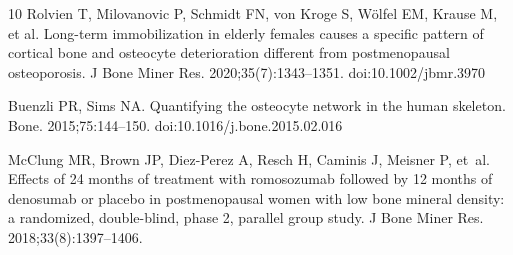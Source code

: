 \documentclass[10pt,letterpaper]{article}
\begin{document}
\begin{thebibliography}{10}
Rolvien T, Milovanovic P, Schmidt FN, von Kroge S, W\"olfel EM, Krause M, et al.
\newblock Long-term immobilization in elderly females causes a specific pattern
  of cortical bone and osteocyte deterioration different from postmenopausal
  osteoporosis.
\newblock J Bone Miner Res. 2020;35(7):1343--1351. doi:10.1002/jbmr.3970

Buenzli PR, Sims NA.
\newblock Quantifying the osteocyte network in the human skeleton.
\newblock Bone. 2015;75:144--150. doi:10.1016/j.bone.2015.02.016

McClung MR, Brown JP, Diez-Perez A, Resch H, Caminis J, Meisner P, et~al.
\newblock Effects of 24 months of treatment with romosozumab followed by 12
  months of denosumab or placebo in postmenopausal women with low bone mineral
  density: a randomized, double-blind, phase 2, parallel group study.
\newblock J Bone Miner Res. 2018;33(8):1397--1406.

\end{thebibliography}
\end{document}
